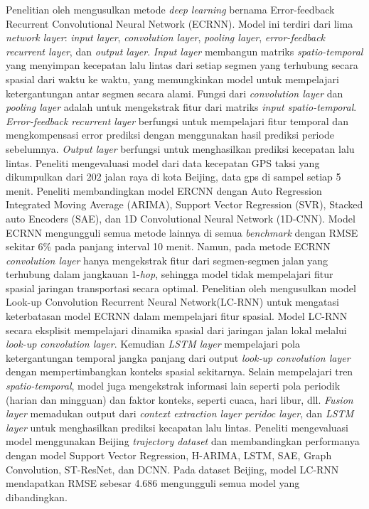 Penelitian oleh \cite{Wang2016} mengusulkan metode \textit{deep learning} bernama Error-feedback Recurrent Convolutional Neural Network (ECRNN). Model ini terdiri dari lima \textit{network layer}: \textit{input layer}, \textit{convolution layer}, \textit{pooling layer}, \textit{error-feedback recurrent layer}, dan \textit{output layer}. \textit{Input layer} membangun matriks \textit{spatio-temporal} yang menyimpan kecepatan lalu lintas dari setiap segmen yang terhubung secara spasial dari waktu ke waktu, yang memungkinkan model untuk mempelajari ketergantungan antar segmen secara alami. Fungsi dari \textit{convolution layer} dan \textit{pooling layer} adalah untuk mengekstrak fitur dari matriks \textit{input spatio-temporal}. \textit{Error-feedback recurrent layer} berfungsi untuk mempelajari fitur temporal dan mengkompensasi error prediksi dengan menggunakan hasil prediksi periode sebelumnya. \textit{Output layer} berfungsi untuk menghasilkan prediksi kecepatan lalu lintas. Peneliti mengevaluasi model dari data kecepatan GPS taksi yang dikumpulkan dari 202 jalan raya di kota Beijing, data gps di sampel setiap 5 menit. Peneliti membandingkan model ERCNN dengan Auto Regression Integrated Moving Average (ARIMA), Support Vector Regression (SVR), Stacked auto Encoders (SAE), dan 1D Convolutional Neural Network (1D-CNN). Model ECRNN mengungguli semua metode lainnya di semua \textit{benchmark} dengan RMSE sekitar 6\% pada panjang interval 10 menit. Namun, pada metode ECRNN \textit{convolution layer} hanya mengekstrak fitur dari segmen-segmen jalan yang terhubung dalam jangkauan 1-\textit{hop}, sehingga model tidak mempelajari fitur spasial jaringan transportasi secara optimal. Penelitian oleh \cite{Zhongjian2018} mengusulkan model Look-up Convolution Recurrent Neural Network(LC-RNN) untuk mengatasi keterbatasan model ECRNN dalam mempelajari fitur spasial. Model LC-RNN secara eksplisit mempelajari dinamika spasial dari jaringan jalan lokal melalui \textit{look-up convolution layer}. Kemudian \textit{LSTM layer} mempelajari pola ketergantungan temporal jangka panjang dari output \textit{look-up convolution layer} dengan mempertimbangkan konteks spasial sekitarnya. Selain mempelajari tren \textit{spatio-temporal}, model juga mengekstrak informasi lain seperti pola periodik (harian dan mingguan) dan faktor konteks, seperti cuaca, hari libur, dll. \textit{Fusion layer} memadukan output dari \textit{context extraction layer} \textit{peridoc layer}, dan \textit{LSTM layer} untuk menghasilkan prediksi kecapatan lalu lintas. Peneliti mengevaluasi model menggunakan Beijing \textit{trajectory dataset} dan membandingkan performanya dengan model Support Vector Regression, H-ARIMA, LSTM, SAE, Graph Convolution, ST-ResNet, dan DCNN. Pada dataset Beijing, model LC-RNN mendapatkan RMSE sebesar 4.686 mengungguli semua model yang dibandingkan. 

